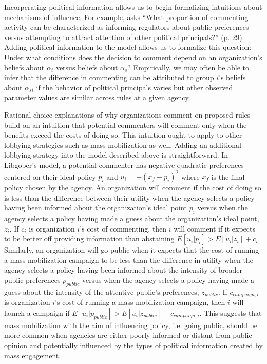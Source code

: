 Incorperating political information allows us to begin formalizing intuitions about mechanisms of influence. For example, \citet{Libgober2018} asks ``What proportion of commenting activity can be characterized as informing regulators about public preferences versus attempting to attract attention of other political principals?'' (p. 29). Adding political information to the model allows us to formalize this question: Under what conditions does the decision to comment depend on an organization's beliefs about $\alpha_t$ versus beliefs about $\alpha_s$? %
Empirically, we may often be able to infer that the difference in commenting can be attributed to group $i$'s beliefs about $\alpha_{si}$ if the behavior of political principals varies but other observed parameter values are similar across rules at a given agency.

Rational-choice explanations of why organizations comment on proposed rules build on an intuition that potential commenters will comment only when the benefits exceed the costs of doing so. This intuition ought to apply to other lobbying strategies such as mass mobilization as well. Adding an additional lobbying strategy into the model described above is straightforward. In Libgober's model, a potential commenter has negative quadratic preferences centered on their ideal policy $p_i$ and $u_i = -(x_f - p_i)^2$ where $x_f$ is the final policy chosen by the agency. An organization will comment if the cost of doing so is less than the difference between their utility when the agency selects a policy having been informed about the organization's ideal point $p_i$ versus when the agency selects a policy having made a guess about the organization's ideal point, $z_i$. If $c_i$ is organization $i$'s cost of commenting, then $i$ will comment if it expects to be better off providing information than abstaining $E[u_i | p_i] > E[u_i | z_i] + c_i$. Similarly, an organization will go public when it expects that the cost of running a mass mobilization campaign to be less than the difference in utility when the agency selects a policy having been informed about the intensity of broader public preferences $p_{public}$ versus when the agency selects a policy having made a guess about the intensity of the attentive public's preferences, $z_{public}$. If $c_{campaign, i}$ is organization $i$'s cost of running a mass mobilization campaign, then $i$ will launch a campaign if $E[u_i | p_{public}] > E[u_i | z_{public}] + c_{campaign, i}$. This suggests that mass mobilization with the aim of influencing policy, i.e. going public, should be more common when agencies are either poorly informed or distant from public opinion and potentially influenced by the types of political information created by mass engagement. 


